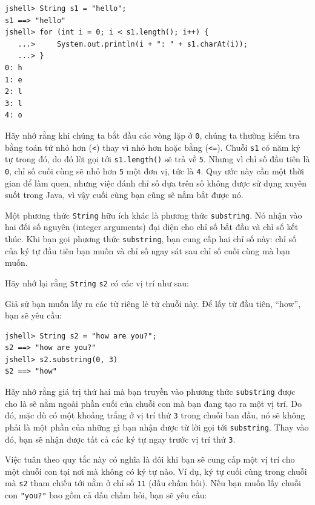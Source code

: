 \begin{verbatim}
jshell> String s1 = "hello"; 
s1 ==> "hello"
jshell> for (int i = 0; i < s1.length(); i++) {
   ...>     System.out.println(i + ": " + s1.charAt(i));
   ...> }
0: h
1: e
2: l
3: l
4: o
\end{verbatim}

Hãy nhớ rằng khi chúng ta bắt đầu các vòng lặp ở \texttt{0}, chúng ta
thường kiểm tra bằng toán tử nhỏ hơn (\texttt{\textless{}}) thay vì nhỏ
hơn hoặc bằng (\texttt{\textless{}=}). Chuỗi \texttt{s1} có năm ký tự
trong đó, do đó lời gọi tới \texttt{s1.length()} sẽ trả về \texttt{5}.
Nhưng vì chỉ số đầu tiên là \texttt{0}, chỉ số cuối cùng sẽ nhỏ hơn
\texttt{5} một đơn vị, tức là \texttt{4}. Quy ước này cần một thời gian
để làm quen, nhưng việc đánh chỉ số dựa trên số không được sử dụng xuyên
suốt trong Java, vì vậy cuối cùng bạn cũng sẽ nắm bắt được nó.

Một phương thức \texttt{String} hữu ích khác là phương thức
\texttt{substring}. Nó nhận vào hai đối số nguyên (integer arguments)
đại diện cho chỉ số bắt đầu và chỉ số kết thúc. Khi bạn gọi phương thức
\texttt{substring}, bạn cung cấp hai chỉ số này: chỉ số của ký tự đầu
tiên bạn muốn và chỉ số ngay sát sau chỉ số cuối cùng mà bạn muốn.

Hãy nhớ lại rằng \texttt{String} \texttt{s2} có các vị trí như sau:

Giả sử bạn muốn lấy ra các từ riêng lẻ từ chuỗi này. Để lấy từ đầu tiên,
``how'', bạn sẽ yêu cầu:

\begin{verbatim}
jshell> String s2 = "how are you?";
s2 ==> "how are you?"
jshell> s2.substring(0, 3)
$2 ==> "how"
\end{verbatim}

Hãy nhớ rằng giá trị thứ hai mà bạn truyền vào phương thức
\texttt{substring} được cho là sẽ nằm ngoài phần cuối của chuỗi con mà
bạn đang tạo ra một vị trí. Do đó, mặc dù có một khoảng trắng ở vị trí
thứ \texttt{3} trong chuỗi ban đầu, nó sẽ không phải là một phần của
những gì bạn nhận được từ lời gọi tới \texttt{substring}. Thay vào đó,
bạn sẽ nhận được tất cả các ký tự ngay trước vị trí thứ \texttt{3}.

Việc tuân theo quy tắc này có nghĩa là đôi khi bạn sẽ cung cấp một vị
trí cho một chuỗi con tại nơi mà không có ký tự nào. Ví dụ, ký tự cuối
cùng trong chuỗi mà \texttt{s2} tham chiếu tới nằm ở chỉ số \texttt{11}
(dấu chấm hỏi). Nếu bạn muốn lấy chuỗi con \texttt{"you?"} bao gồm cả
dấu chấm hỏi, bạn sẽ yêu cầu:

